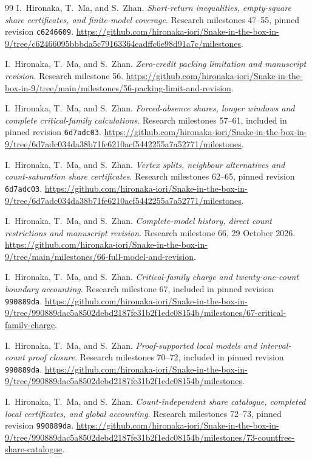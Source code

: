 \documentclass[11pt,a4paper]{article}
\theoremstyle{definition}
\theoremstyle{remark}
\begin{document}
\begin{thebibliography}{99}
I.~Hironaka, T.~Ma, and S.~Zhan. \emph{Short-return inequalities, empty-square share certificates, and finite-model coverage}. Research milestones 47--55, pinned revision \texttt{c6246609}.
\url{https://github.com/hironaka-iori/Snake-in-the-box-in-9/tree/c62466095bbbda5c79163364eadffc6e98d91a7c/milestones}.

I.~Hironaka, T.~Ma, and S.~Zhan. \emph{Zero-credit packing limitation and manuscript revision}. Research milestone 56.
\url{https://github.com/hironaka-iori/Snake-in-the-box-in-9/tree/main/milestones/56-packing-limit-and-revision}.

I.~Hironaka, T.~Ma, and S.~Zhan. \emph{Forced-absence shares, longer windows and complete critical-family calculations}. Research milestones 57--61, included in pinned revision \texttt{6d7adc03}.
\url{https://github.com/hironaka-iori/Snake-in-the-box-in-9/tree/6d7adc034da38b71fe6210acf5442255a7a52771/milestones}.

I.~Hironaka, T.~Ma, and S.~Zhan. \emph{Vertex splits, neighbour alternatives and count-saturation share certificates}. Research milestones 62--65, pinned revision \texttt{6d7adc03}.
\url{https://github.com/hironaka-iori/Snake-in-the-box-in-9/tree/6d7adc034da38b71fe6210acf5442255a7a52771/milestones}.

I.~Hironaka, T.~Ma, and S.~Zhan. \emph{Complete-model history, direct count restrictions and manuscript revision}. Research milestone 66, 29 October 2026.
\url{https://github.com/hironaka-iori/Snake-in-the-box-in-9/tree/main/milestones/66-full-model-and-revision}.

I.~Hironaka, T.~Ma, and S.~Zhan. \emph{Critical-family charge and twenty-one-count boundary accounting}. Research milestone 67, included in pinned revision \texttt{990889da}.
\url{https://github.com/hironaka-iori/Snake-in-the-box-in-9/tree/990889dac5a8502debd2187fe31b2f1edc08154b/milestones/67-critical-family-charge}.

I.~Hironaka, T.~Ma, and S.~Zhan. \emph{Proof-supported local models and interval-count proof closure}. Research milestones 70--72, included in pinned revision \texttt{990889da}.
\url{https://github.com/hironaka-iori/Snake-in-the-box-in-9/tree/990889dac5a8502debd2187fe31b2f1edc08154b/milestones}.

I.~Hironaka, T.~Ma, and S.~Zhan. \emph{Count-independent share catalogue, completed local certificates, and global accounting}. Research milestones 72--73, pinned revision \texttt{990889da}.
\url{https://github.com/hironaka-iori/Snake-in-the-box-in-9/tree/990889dac5a8502debd2187fe31b2f1edc08154b/milestones/73-countfree-share-catalogue}.


\end{thebibliography}
\end{document}

